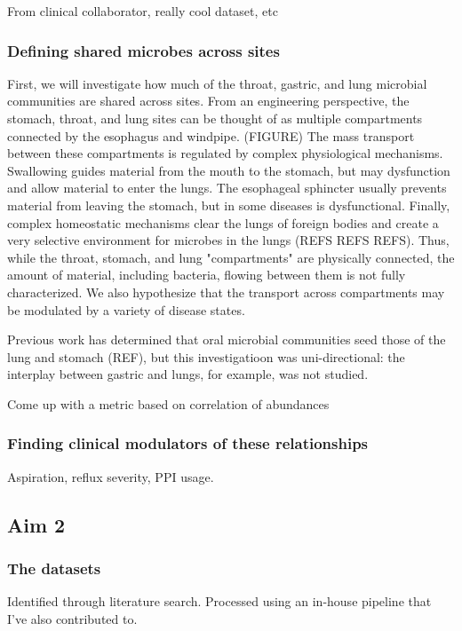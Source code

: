\documentclass[12pt]{article}
\begin{document}
From clinical collaborator, really cool dataset, etc

\subsubsection{Defining shared microbes across sites}
First, we will investigate how much of the throat, gastric, and lung microbial communities are shared across sites. From an engineering perspective, the stomach, throat, and lung sites can be thought of as multiple compartments connected by the esophagus and windpipe. (FIGURE) The mass transport between these compartments is regulated by complex physiological mechanisms. Swallowing guides material from the mouth to the stomach, but may dysfunction and allow material to enter the lungs. The esophageal sphincter usually prevents material from leaving the stomach, but in some diseases is dysfunctional. Finally, complex homeostatic mechanisms clear the lungs of foreign bodies and create a very selective environment for microbes in the lungs (REFS REFS REFS). Thus, while the throat, stomach, and lung "compartments" are physically connected, the amount of material, including bacteria, flowing between them is not fully characterized. We also hypothesize that the transport across compartments may be modulated by a variety of disease states.

Previous work has determined that oral microbial communities seed those of the lung and stomach (REF), but this investigatioon was uni-directional: the interplay between gastric and lungs, for example, was not studied. 

Come up with a metric based on correlation of abundances

\subsubsection{Finding clinical modulators of these relationships}
Aspiration, reflux severity, PPI usage.

\subsection*{Aim 2}

\subsubsection*{The datasets}
Identified through literature search.
Processed using an in-house pipeline that I've also contributed to.
\end{document}
